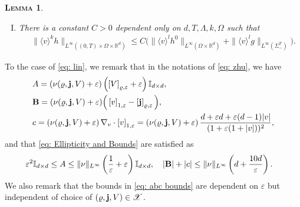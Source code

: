 \documentclass[10pt, reqno]{amsart}
\theoremstyle{plain}
\newtheorem{lemma}[theorem]{\normalfont \scshape Lemma}
\theoremstyle{definition}
\theoremstyle{remark}
\numberwithin{equation}{section}
\newcommand{\bfj}{{\bf j}}
\newcommand{\bfB}{{\bf B}}
\newcommand{\bbI}{\mathbb I}
\newcommand{\R}{\mathbb{R}}
\newcommand{\ve}{\varepsilon}
\newcommand{\lt}{\left}
\newcommand{\rt}{\right}
\newcommand{\renorm}[3]{\lt[#1\rt]_{#2 , #3}}
\begin{document}
\begin{lemma}
\begin{enumerate}[(I)]
\begin{equation*}
\begin{split}
        \end{split}
    \end{equation*}
    \item There is a constant $C>0$ dependent only on $d,T,\Lambda,k,\Omega$ such that
    \begin{align*}
        &\|\langle v \rangle^k h\|_{L^\infty((0,T)\times\Omega\times\R^d)} \le C\Big(\|\langle v\rangle^l h^0 \|_{L^\infty(\Omega\times\R^d)} + \|\langle v\rangle^l g\|_{L^\infty(\Sigma_-^T)} \Big).
    \end{align*}
    \end{enumerate}
\end{lemma}

To the case of \eqref{eq: lin}, we remark that in the notations of \eqref{eq: zhu}, we have
\begin{equation}\label{eq: abc}
\begin{split}
    &A = (\nu(\varrho,\bfj,V) + \ve) \left(\renorm{V}{\varrho}{\ve} + \ve \right) \bbI_{d\times d}, \\
    &\bfB = (\nu(\varrho,\bfj,V) + \ve) \Big(\renorm{v}{1}{\ve} - \renorm{\bfj}{\varrho}{\ve} \Big),\\
    &c = \lt(\nu(\varrho,\bfj,V) + \ve \rt) \nabla_v\cdot \renorm{v}{1}{\ve} = \lt(\nu(\varrho,\bfj,V) + \ve \rt) \frac{d + \ve d + \ve(d-1)|v|}{(1+\ve(1+|v|))^2} ,
\end{split}
\end{equation}
and that \eqref{eq: Ellipticity and Bounds} are satisfied as
\begin{equation}\label{eq: abc bounds}
\begin{split}
    &\ve^{2} \bbI_{d\times d} \le A \le \|\nu\|_{L^\infty} \left(\frac{1}{\ve} + \ve \right) \bbI_{d\times d},  \quad |\bfB| + |c| \le \|\nu\|_{L^\infty} \lt(d + \frac{10d}{\ve}\rt) .
    \end{split}
\end{equation}
We also remark that the bounds in \eqref{eq: abc bounds} are dependent on $\ve$ but independent of choice of $(\varrho, \bfj, V)\in \mathscr{X}$.
\end{document}
